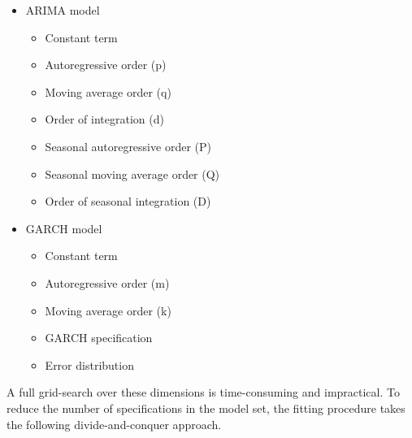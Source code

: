 \documentclass[12pt]{report}
\begin{document}
\begin{itemize}
    \item ARIMA model
        \begin{itemize}
            \item Constant term
            \item Autoregressive order (p)
            \item Moving average order (q)
            \item Order of integration (d)
            \item Seasonal autoregressive order (P)
            \item Seasonal moving average order (Q)
            \item Order of seasonal integration (D)
        \end{itemize}
        \item GARCH model
        \begin{itemize}
            \item Constant term
            \item Autoregressive order (m)
            \item Moving average order (k)
            \item GARCH specification
            \item Error distribution
        \end{itemize}

\end{itemize}

A full grid-search over these dimensions is time-consuming and impractical. To reduce the number of specifications in the model set, the fitting procedure takes the following divide-and-conquer approach.
\end{document}
